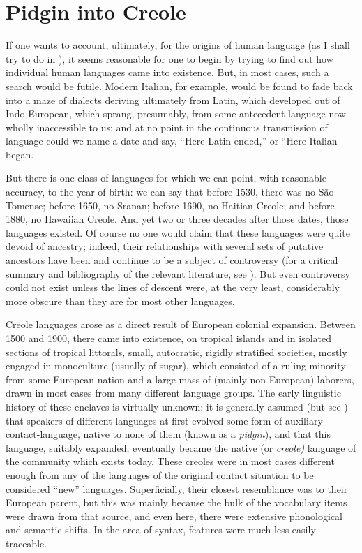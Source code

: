 \chapter{Pidgin into Creole} \label{ch:1}

If one wants to account, ultimately, for the origins of human language (as I shall try to do in ), it seems reasonable for one to begin by trying to find out how individual human languages came into existence. But, in most cases, such a search would be futile. Mod\-ern Italian, for example, would be found to fade back into a maze of dialects deriving ultimately from Latin, which developed out of Indo-European, which sprang, presumably, from some antecedent language now wholly inaccessible to us; and at no point in the continuous transmission of language could we name a date and say, ``Here Latin ended,'' or ``Here Italian began.{\textquotedbl}

But there is one class of languages for which we can point, with reasonable accuracy, to the year of birth: we can say that before 1530, there was no S\~ao Tomense; before 1650, no Sranan; before 1690, no Haitian Creole; and before 1880, no Hawaiian Creole. And yet two or three decades after those dates, those languages existed. Of course no one would claim that these languages were quite devoid of ancestry; indeed, their relationships with several sets of putative ancestors have been and continue to be a subject of controversy (for a critical sum\-mary and bibliography of the relevant literature, see \citealt{Bickerton1976}).
But even controversy could not exist unless the lines of descent were, at the very least, considerably more obscure than they are for most other languages.

Creole languages arose as a direct result of European colonial expansion. Between 1500 and 1900, there came into existence, on tropical islands and in isolated sections of tropical littorals, small, autocratic, rigidly stratified societies, mostly engaged in monoculture (usually of sugar), which consisted of a ruling minority from some European nation and a large mass of (mainly non-European) laborers, drawn in most cases from many different language groups. The early linguistic history of these enclaves is virtually unknown; it is generally assumed (but see \citealt{Alleyne1971,Alleyne1979}) that speakers of different lan\-guages at first evolved some form of auxiliary contact-language, native to none of them (known as a \textit{pidgin}), and that this language, suitably expanded, eventually became the native (or \textit{creol}\textit{e}\textit{) }language of the community which exists today. These creoles were in most cases different enough from any of the languages of the original contact situation to be considered ``new'' languages. Superficially, their closest resemblance was to their European parent, but this was mainly because the bulk of the vocabulary items were drawn from that source, and even here, there were extensive phonological and semantic shifts. In the area of syntax, features were much less easily traceable.

